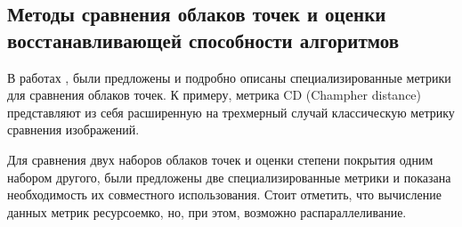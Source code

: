 \subsection{Методы сравнения облаков точек и оценки восстанавливающей способности алгоритмов}

В работах \cite{lrgm-cloud}, \cite{metrics-source} были предложены и подробно описаны специализированные метрики для сравнения облаков точек. К примеру, метрика CD (Champher distance) представляют из себя расширенную на трехмерный случай классическую метрику сравнения изображений. \par
Для сравнения двух наборов облаков точек и оценки степени покрытия одним набором другого, были предложены две специализированные метрики и показана необходимость их совместного использования. Стоит отметить, что вычисление данных метрик ресурсоемко, но, при этом, возможно распараллеливание.